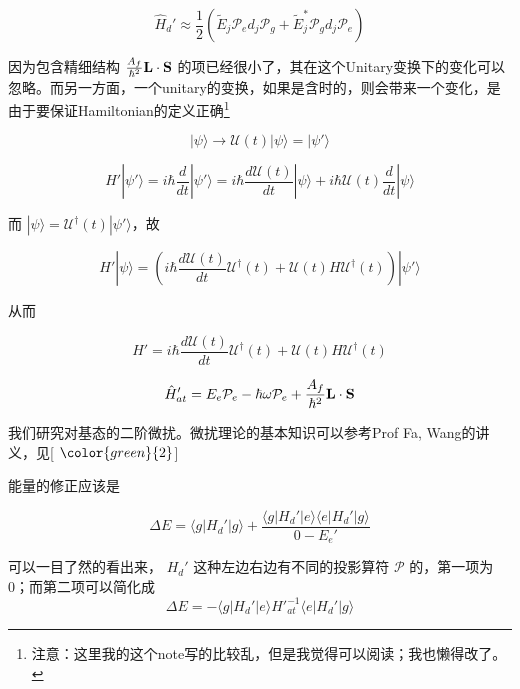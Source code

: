 \begin{equation}
\hat{H}_d' \approx \frac{1}{2}\left(\tilde{E}_j\mathcal{P}_e d_j \mathcal{P}_g + \tilde{E}_j^*\mathcal{P}_g d_j \mathcal{P}_e\right)
\end{equation}

因为包含精细结构 $\frac{A_{f}}{\hbar^2}\bf L\cdot S$ 的项已经很小了，其在这个Unitary变换下的变化可以忽略。而另一方面，一个unitary的变换，如果是含时的，则会带来一个变化，是由于要保证Hamiltonian的定义正确\footnote{注意：这里我的这个note写的比较乱，但是我觉得可以阅读；我也懒得改了。}

\begin{equation}
|\psi\rangle \to \mathcal{U}(t)|\psi\rangle = |\psi'\rangle
\end{equation}

\begin{equation}
H'|\psi'\rangle = i\hbar\frac{d}{dt}|\psi'\rangle = i\hbar\frac{d \mathcal{U}(t)}{dt}|\psi\rangle + i\hbar\mathcal{U}(t)\frac{d}{dt}|\psi\rangle
\end{equation}

而 $|\psi\rangle = \mathcal{U}^\dagger(t)|\psi'\rangle$，故

\begin{equation}
H'|\psi\rangle = \left(i\hbar\frac{d\mathcal{U}(t)}{dt}\mathcal{U}^\dagger(t) + \mathcal{U}(t)H\mathcal{U}^\dagger(t)\right)|\psi'\rangle 
\end{equation}

从而

\begin{equation}
H'= i\hbar\frac{d\mathcal{U}(t)}{dt}\mathcal{U}^\dagger(t) + \mathcal{U}(t)H\mathcal{U}^\dagger(t)
\end{equation}

\begin{equation}
\hat{H}'_{at} = E_e \mathcal{P}_e - \hbar\omega\mathcal{P}_e + \frac{A_{f}}{\hbar^2}\bf L\cdot S 
\end{equation}

我们研究对基态的二阶微扰。微扰理论的基本知识可以参考Prof Fa, Wang的讲义，见[ $\color{green}{2}$]

能量的修正应该是

\begin{equation}
\Delta E = \langle g|H_d'|g\rangle + \frac{\langle g|H_d'|e\rangle \langle e|H_d'|g\rangle}{0-E_e'}
\end{equation}

可以一目了然的看出来， $H_d'$ 这种左边右边有不同的投影算符 $\mathcal{P}$ 的，第一项为 0；而第二项可以简化成
\begin{equation}
\Delta E = - \langle g|H_d'|e\rangle H'^{-1}_{at} \langle e|H_d'|g\rangle
\end{equation}

